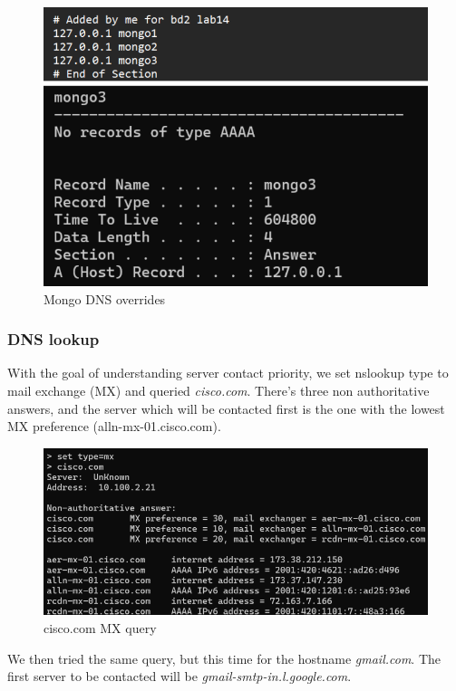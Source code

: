 \begin{figure}[htbp]
    \centering
    \includegraphics[width=1\linewidth]{img/10.png}
    \caption{Mongo DNS overrides}\label{fig:10}
\end{figure}

\subsubsection{DNS lookup}

With the goal of understanding server contact priority, we set nslookup type to
mail exchange (MX) and queried \textit{cisco.com}. There's three non
authoritative answers, and the server which will be contacted first is the one
with the lowest MX preference (alln-mx-01.cisco.com).

\begin{figure}[htbp]
    \centering
    \includegraphics[width=1\linewidth]{img/11.png}
    \caption{cisco.com MX query}\label{fig:11}
\end{figure}

We then tried the same query, but this time for the hostname
\textit{gmail.com}. The first server to be contacted will be
\textit{gmail-smtp-in.l.google.com}.

